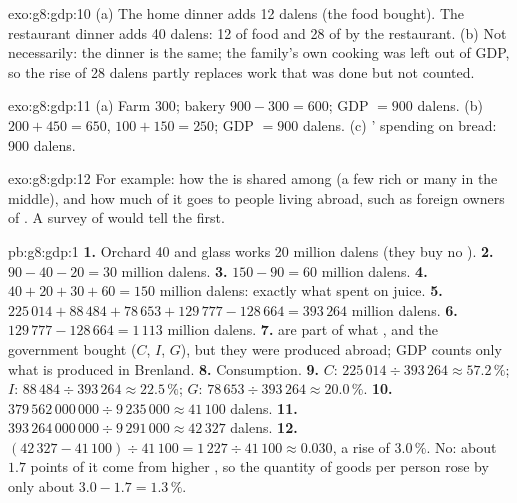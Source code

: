 \begin{solution}{exo:g8:gdp:10}
(a) The home dinner adds 12 dalens (the food bought). The restaurant dinner adds 40 dalens: 12 of
food and 28 of  by the restaurant. (b) Not necessarily: the dinner is the same; the
family's own cooking was left out of GDP, so the rise of 28 dalens partly replaces work that was
done but not counted.
\end{solution}

\begin{solution}{exo:g8:gdp:11}
(a) Farm $300$; bakery $900 - 300 = 600$; GDP $= 900$ dalens. (b)  $200 + 450 = 650$, 
$100 + 150 = 250$; GDP $= 900$ dalens. (c) ' spending on bread: 900 dalens.
\end{solution}

\begin{solution}{exo:g8:gdp:12}
For example: how the  is shared among  (a few rich or many in the middle), and how
much of it goes to people living abroad, such as foreign owners of . A survey of 
 would tell the first.
\end{solution}

\begin{solution}{pb:g8:gdp:1}
\textbf{1.} Orchard 40 and glass works 20 million dalens (they buy no ).
\textbf{2.} $90 - 40 - 20 = 30$ million dalens.
\textbf{3.} $150 - 90 = 60$ million dalens.
\textbf{4.} $40 + 20 + 30 + 60 = 150$ million dalens: exactly what  spent on juice.
\textbf{5.} $225\,014 + 88\,484 + 78\,653 + 129\,777 - 128\,664 = 393\,264$ million dalens.
\textbf{6.} $129\,777 - 128\,664 = 1\,113$ million dalens.
\textbf{7.}  are part of what ,  and the government bought ($C$, $I$, $G$),
but they were produced abroad; GDP counts only what is produced in Brenland.
\textbf{8.} Consumption.
\textbf{9.} $C$: $225\,014 \div 393\,264 \approx 57.2\,\%$; $I$: $88\,484 \div 393\,264 \approx
22.5\,\%$; $G$: $78\,653 \div 393\,264 \approx 20.0\,\%$.
\textbf{10.} $379\,562\,000\,000 \div 9\,235\,000 \approx 41\,100$ dalens.
\textbf{11.} $393\,264\,000\,000 \div 9\,291\,000 \approx 42\,327$ dalens.
\textbf{12.} $(42\,327 - 41\,100) \div 41\,100 = 1\,227 \div 41\,100 \approx 0.030$, a rise of
$3.0\,\%$. No: about $1.7$ points of it come from higher , so the quantity of goods per
person rose by only about $3.0 - 1.7 = 1.3\,\%$.
\end{solution}
